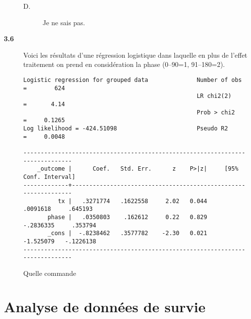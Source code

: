 \begin{description}
\begin{description}
\item[D.] Je ne sais pas.
\end{description}
\item[\bf 3.6] Voici les résultats d'une régression logistique dans laquelle
  en plus de l'effet traitement on prend en considération la phase (0–90=1,
  91–180=2). 
\begin{verbatim}
Logistic regression for grouped data              Number of obs   =        624
                                                  LR chi2(2)      =       4.14
                                                  Prob > chi2     =     0.1265
Log likelihood = -424.51098                       Pseudo R2       =     0.0048

------------------------------------------------------------------------------
    _outcome |      Coef.   Std. Err.      z    P>|z|     [95% Conf. Interval]
-------------+----------------------------------------------------------------
          tx |   .3271774   .1622558     2.02   0.044     .0091618     .645193
       phase |   .0350803    .162612     0.22   0.829    -.2836335     .353794
       _cons |  -.8238462   .3577782    -2.30   0.021    -1.525079   -.1226138
------------------------------------------------------------------------------
\end{verbatim}
Quelle commande 
\end{description}


\chapter{Analyse de données de survie}

